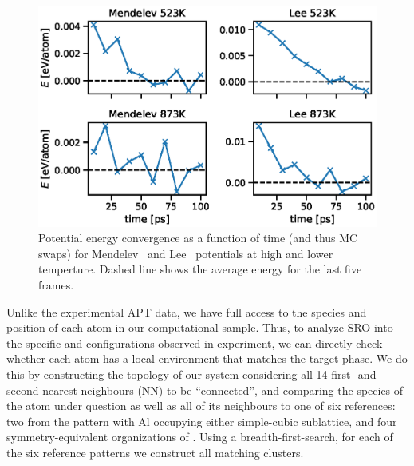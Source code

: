 \begin{figure}[h]
    \centering
    \includegraphics[width=\textwidth]{figures/energy_conv}
    \caption{Potential energy convergence as a function of time (and thus MC swaps) for Mendelev~\cite{mendelev2005effect} and Lee~\cite{lee2010modified} potentials at high and lower temperture. Dashed line shows the average energy for the last five frames.}
    \label{fig:energy_conv}
\end{figure}

Unlike the experimental APT data, we have full access to the species and position of each atom in our computational sample.
Thus, to analyze SRO into the specific \DOTHREE and \BTWO configurations observed in experiment, we can directly check whether each atom has a local environment that matches the target phase.
We do this by constructing the topology of our system considering all 14 first- and second-nearest neighbours (NN) to be ``connected'', and comparing the species of the atom under question as well as all of its neighbours to one of six references: two from the \BTWO pattern with Al occupying either simple-cubic sublattice, and four symmetry-equivalent organizations of \DOTHREE.
Using a breadth-first-search, for each of the six reference patterns we construct all matching clusters.

